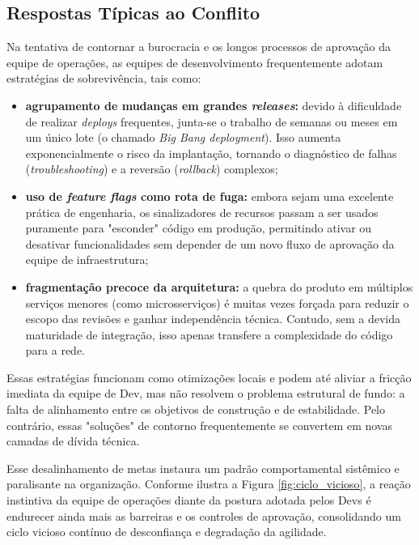 \documentclass[12pt,a4paper,twoside]{report}
\begin{document}
\subsection{Respostas Típicas ao Conflito}

Na tentativa de contornar a burocracia e os longos processos de aprovação da equipe de operações, as equipes de desenvolvimento frequentemente adotam estratégias de sobrevivência, tais como:

\begin{itemize}[nosep]
\item \textbf{agrupamento de mudanças em grandes \emph{releases}:} devido à dificuldade de realizar \emph{deploys} frequentes, junta-se o trabalho de semanas ou meses em um único lote (o chamado \emph{Big Bang deployment}). Isso aumenta exponencialmente o risco da implantação, tornando o diagnóstico de falhas (\emph{troubleshooting}) e a reversão (\emph{rollback}) complexos;
\item \textbf{uso de \emph{feature flags} como rota de fuga:} embora sejam uma excelente prática de engenharia, os sinalizadores de recursos passam a ser usados puramente para "esconder" código em produção, permitindo ativar ou desativar funcionalidades sem depender de um novo fluxo de aprovação da equipe de infraestrutura;
\item \textbf{fragmentação precoce da arquitetura:} a quebra do produto em múltiplos serviços menores (como microsserviços) é muitas vezes forçada para reduzir o escopo das revisões e ganhar independência técnica. Contudo, sem a devida maturidade de integração, isso apenas transfere a complexidade do código para a rede.
\end{itemize}

Essas estratégias funcionam como otimizações locais e podem até aliviar a fricção imediata da equipe de Dev, mas não resolvem o problema estrutural de fundo: a falta de alinhamento entre os objetivos de construção e de estabilidade. Pelo contrário, essas "soluções" de contorno frequentemente se convertem em novas camadas de dívida técnica.

Esse desalinhamento de metas instaura um padrão comportamental sistêmico e paralisante na organização. Conforme ilustra a Figura \ref{fig:ciclo_vicioso}, a reação instintiva da equipe de operações diante da postura adotada pelos Devs é endurecer ainda mais as barreiras e os controles de aprovação, consolidando um ciclo vicioso contínuo de desconfiança e degradação da agilidade.
\end{document}
